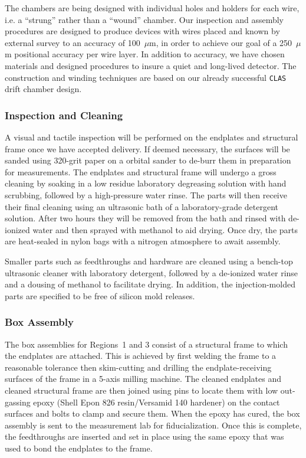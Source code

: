 The chambers are being designed with individual holes and holders for
each wire, i.e. a ``strung'' rather than a ``wound'' chamber.  Our 
inspection and assembly procedures are designed to produce devices with 
wires placed and known by external survey to an accuracy of 100~$\mu$m, 
in order to achieve our goal of a 250~$\mu$m positional accuracy per wire 
layer.  In addition to accuracy, we have chosen materials and designed 
procedures to insure a quiet and long-lived detector.  The construction 
and winding techniques are based on our already successful {\tt CLAS} 
drift chamber design.

\subsubsection{Inspection and Cleaning}

A visual and tactile inspection will be performed on the endplates and 
structural frame once we have accepted delivery.  If deemed necessary, 
the surfaces will be sanded using 320-grit paper on a orbital sander to 
de-burr them in preparation for measurements.  The endplates and structural 
frame will undergo a gross cleaning by soaking in a low residue laboratory 
degreasing solution with hand scrubbing, followed by a high-pressure water 
rinse. The parts will then receive their final cleaning using an ultrasonic 
bath of a laboratory-grade detergent solution.  After two hours they will 
be removed from the bath and rinsed with de-ionized water and then sprayed 
with methanol to aid drying. Once dry, the parts are heat-sealed in nylon 
bags with a nitrogen atmosphere to await assembly.

Smaller parts such as feedthroughs and hardware are cleaned using a 
bench-top ultrasonic cleaner with laboratory detergent, followed by a 
de-ionized water rinse and a dousing of methanol to facilitate drying.  
In addition, the injection-molded parts are specified to be free of silicon 
mold releases.

\subsubsection{Box Assembly}

The box assemblies for Regions~1 and 3 consist of a structural frame to 
which the endplates are attached.  This is achieved by first welding the 
frame to a reasonable tolerance then skim-cutting and drilling the 
endplate-receiving surfaces of the frame in a 5-axis milling machine.  The 
cleaned endplates and cleaned structural frame are then joined using pins 
to locate them with low out-gassing epoxy (Shell Epon 826 resin/Versamid 140 
hardener) on the contact surfaces and bolts to clamp and secure them.  When 
the epoxy has cured, the box assembly is sent to the measurement lab for 
fiducialization.  Once this is complete, the feedthroughs are inserted and 
set in place using the same epoxy that was used to bond the endplates to 
the frame.

